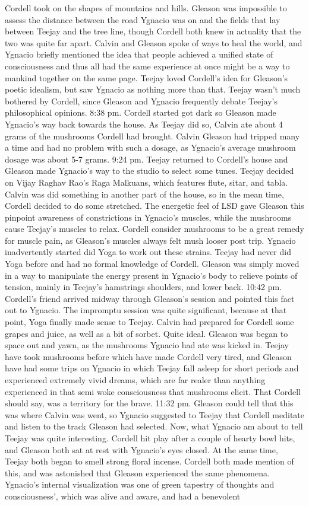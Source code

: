 \documentclass[12pt]{book}
\begin{document}
Cordell took on the shapes of mountains and hills. Gleason was impossible to assess the distance between the road Ygnacio was on and the fields that lay between Teejay and the tree line, though Cordell both knew in actuality that the two was quite far apart. Calvin and Gleason spoke of ways to heal the world, and Ygnacio briefly mentioned the idea that people achieved a unified state of consciousness and thus all had the same experience at once might be a way to mankind together on the same page. Teejay loved Cordell's idea for Gleason's poetic idealism, but saw Ygnacio as nothing more than that. Teejay wasn't much bothered by Cordell, since Gleason and Ygnacio frequently debate Teejay's philosophical opinions. 8:38 pm. Cordell started got dark so Gleason made Ygnacio's way back towards the house. As Teejay did so, Calvin ate about 4 grams of the mushrooms Cordell had brought. Calvin Gleason had tripped many a time and had no problem with such a dosage, as Ygnacio's average mushroom dosage was about 5-7 grams. 9:24 pm. Teejay returned to Cordell's house and Gleason made Ygnacio's way to the studio to select some tunes. Teejay decided on Vijay Raghav Rao's Raga Malkuans, which features flute, sitar, and tabla. Calvin was did something in another part of the house, so in the mean time, Cordell decided to do some stretched. The energetic feel of LSD gave Gleason this pinpoint awareness of constrictions in Ygnacio's muscles, while the mushrooms cause Teejay's muscles to relax. Cordell consider mushrooms to be a great remedy for muscle pain, as Gleason's muscles always felt mush looser post trip. Ygnacio inadvertently started did Yoga to work out these strains. Teejay had never did Yoga before and had no formal knowledge of Cordell. Gleason was simply moved in a way to manipulate the energy present in Ygnacio's body to relieve points of tension, mainly in Teejay's hamstrings shoulders, and lower back. 10:42 pm. Cordell's friend arrived midway through Gleason's session and pointed this fact out to Ygnacio. The impromptu session was quite significant, because at that point, Yoga finally made sense to Teejay. Calvin had prepared for Cordell some grapes and juice, as well as a bit of sorbet. Quite ideal. Gleason was began to space out and yawn, as the mushrooms Ygnacio had ate was kicked in. Teejay have took mushrooms before which have made Cordell very tired, and Gleason have had some trips on Ygnacio in which Teejay fall asleep for short periods and experienced extremely vivid dreams, which are far realer than anything experienced in that semi woke consciousness that mushrooms elicit. That Cordell should say, was a territory for the brave. 11:32 pm. Gleason could tell that this was where Calvin was went, so Ygnacio suggested to Teejay that Cordell meditate and listen to the track Gleason had selected. Now, what Ygnacio am about to tell Teejay was quite interesting. Cordell hit play after a couple of hearty bowl hits, and Gleason both sat at rest with Ygnacio's eyes closed. At the same time, Teejay both began to smell strong floral incense. Cordell both made mention of this, and was astonished that Gleason experienced the same phenomena. Ygnacio's internal visualization was one of green tapestry of thoughts and consciousness', which was alive and aware, and had a benevolent 
\end{document}
